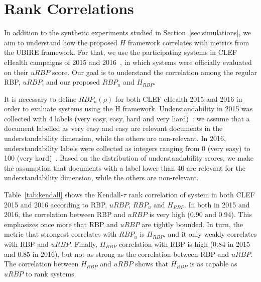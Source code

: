 \section{Rank Correlations} %
\label{sec:clef}

In addition to the synthetic experiments studied in Section~\ref{sec:simulations}, we aim to understand how the proposed $H$ framework correlates with metrics from the UBIRE framework.
For that, we use the participating systems in CLEF eHealth campaigns of 2015 and 2016~\cite{clefIR15,clefIR16}, in which systems were officially evaluated on their $uRBP$ score.
Our goal is to understand the correlation among the regular RBP, $uRBP$, and our proposed $RBP_u$ and $H_{RBP}$.

It is necessary to define $RBP_u(\rho)$ for both CLEF eHealth 2015 and 2016 in order to evaluate systems using the H framework. 
Understandability in 2015 was collected with 4 labels (very easy, easy, hard and very hard)~\cite{clefIR15}: we assume that a document labelled as very easy and easy are relevant documents in the understandability dimension, while the others are non-relevant.
In 2016, understandability labels were collected as integers ranging from 0 (very easy) to 100 (very hard)~\cite{clefIR16}. Based on the distribution of understandability scores, we make the assumption that documents with a label lower than 40 are relevant for the understandability dimension, while the others are non-relevant.

Table~\ref{tab:kendall} shows the Kendall-$\tau$ rank correlation of system in both CLEF 2015 and 2016 according to RBP, $uRBP$, $RBP_u$ and $H_{RBP}$. 
In both in 2015 and 2016, the correlation between RBP and $uRBP$ is very high (0.90 and 0.94). This emphasizes once more that RBP and $uRBP$ are tightly bounded.
In turn, the metric that strongest correlates with $RBP_u$ is $H_{RBP}$, and it only weakly correlates with RBP and $uRBP$.
Finally, $H_{RBP}$ correlation with RBP is high (0.84 in 2015 and 0.85 in 2016), but not as strong as the correlation between RBP and $uRBP$.
The correlation between $H_{RBP}$ and $uRBP$ shows that $H_{RBP}$ is as capable as $uRBP$ to rank systems.


 
